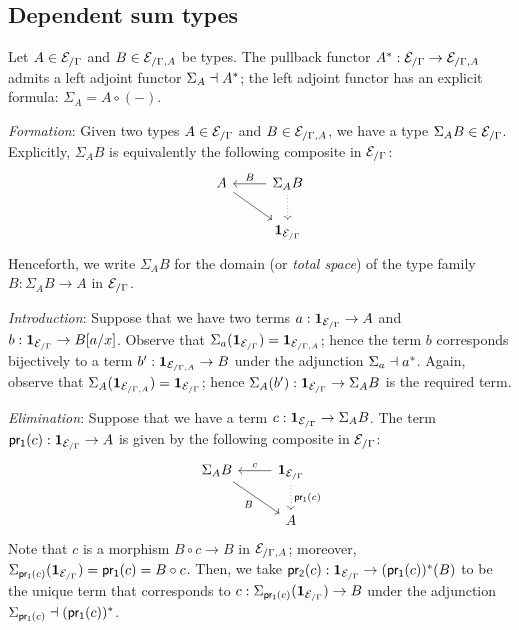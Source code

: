\documentclass[a4paper]{article}
\begin{document}
\subsection{Dependent sum types}

Let $A \in \mathcal{E}_{/\Gamma}$ and $B \in \mathcal{E}_{/\Gamma,A}$ be types.
The pullback functor $A^* : \mathcal{E}_{/\Gamma} \to \mathcal{E}_{/\Gamma,A}$ admits a left adjoint functor $\Sigma_{A} \dashv A^*$; the left adjoint functor has an explicit formula: $\Sigma_A = A \circ (-)$.

\emph{Formation}: Given two types $A \in \mathcal{E}_{/\Gamma}$ and $B \in \mathcal{E}_{/\Gamma,A}$, we have a type $\Sigma_AB \in \mathcal{E}_{/\Gamma}$.
Explicitly, $\Sigma_AB$ is equivalently the following composite in $\mathcal{E}_{/\Gamma}$:
\[\begin{tikzcd}
    A & {\Sigma_AB} \\
    & {\termObj{\Sl{\cE}{\Gamma}}}
    \arrow[from=1-1, to=2-2]
    \arrow["B"', from=1-2, to=1-1]
    \arrow[dotted, from=1-2, to=2-2]
  \end{tikzcd}\]
Henceforth, we write $\Sigma_AB$ for the domain (or \emph{total space}) of the type family $B : \Sigma_AB \to A$ in $\mathcal{E}_{/\Gamma}$.

\emph{Introduction}: Suppose that we have two terms $a : \mathbf{1}_{\mathcal{E}_{/\Gamma}} \to A$ and $b : \mathbf{1}_{\mathcal{E}_{/\Gamma}} \to B[a/x]$.
Observe that $\Sigma_a(\mathbf{1}_{\mathcal{E}_{/\Gamma}}) = \mathbf{1}_{\mathcal{E}_{/\Gamma,A}}$; hence the term $b$ corresponds bijectively to a term $b' : \mathbf{1}_{\mathcal{E}_{/\Gamma,A}} \to B$ under the adjunction $\Sigma_a \dashv a^*$.
Again, observe that $\Sigma_A(\mathbf{1}_{\mathcal{E}_{/\Gamma,A}}) = \mathbf{1}_{\mathcal{E}_{/\Gamma}}$; hence $\Sigma_A(b') : \mathbf{1}_{\mathcal{E}_{/\Gamma}} \to \Sigma_AB$ is the required term.

\emph{Elimination}: Suppose that we have a term $c : \mathbf{1}_{\mathcal{E}_{/\Gamma}} \to \Sigma_AB$.
The term $\operatorname{\mathsf{pr_1}}(c) : \mathbf{1}_{\mathcal{E}_{/\Gamma}} \to A$ is given by the following composite in $\mathcal{E}_{/\Gamma}$:
\[\begin{tikzcd}
    {\Sigma_AB} & {\termObj{\Sl{\cE}{\Gamma}}} \\
    & A
    \arrow["B"', from=1-1, to=2-2]
    \arrow["c"', from=1-2, to=1-1]
    \arrow["{\prl(c)}", dotted, from=1-2, to=2-2]
  \end{tikzcd}\]
Note that $c$ is a morphism $B \circ c \to B$ in $\mathcal{E}_{/\Gamma,A}$; moreover, $\Sigma_{\operatorname{\mathsf{pr_1}}(c)}(\mathbf{1}_{\mathcal{E}_{/\Gamma}}) = \operatorname{\mathsf{pr_1}}(c) = B \circ c$.
Then, we take $\operatorname{\mathsf{pr_2}}(c) : \mathbf{1}_{\mathcal{E}_{/\Gamma}} \to (\operatorname{\mathsf{pr_1}}(c))^*(B)$ to be the unique term that corresponds to $c : \Sigma_{\operatorname{\mathsf{pr_1}}(c)}(\mathbf{1}_{\mathcal{E}_{/\Gamma}}) \to B$ under the adjunction $\Sigma_{\operatorname{\mathsf{pr_1}}(c)} \dashv (\operatorname{\mathsf{pr_1}}(c))^*$.
\end{document}
